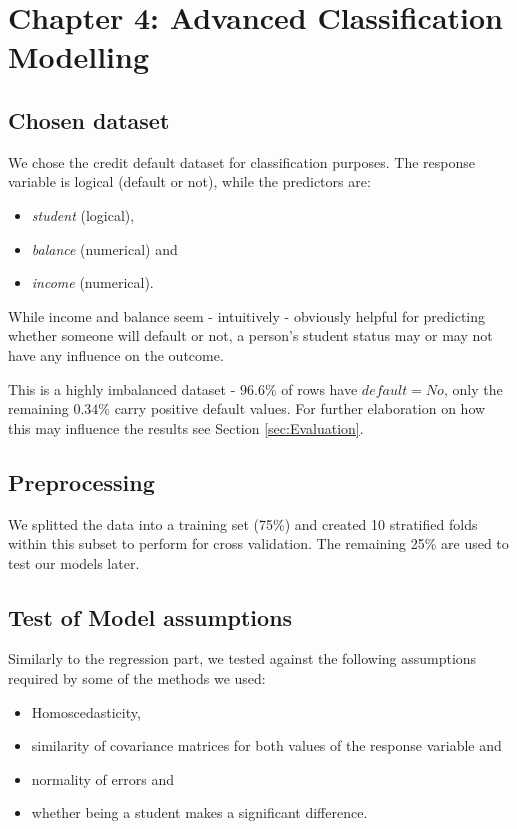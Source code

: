 \documentclass[a4paper]{article}
\begin{document}
\section{Chapter 4: Advanced Classification Modelling}
\label{sec:classification}

\subsection{Chosen dataset}

We chose the credit default dataset for classification purposes. The response variable is logical (default or not), while the predictors are:
\begin{itemize}
	\item \emph{student} (logical),
   	\item \emph{balance} (numerical) and
    \item \emph{income} (numerical).
\end{itemize}
While income and balance seem - intuitively - obviously helpful for predicting whether someone will default or not, a person's student status may or may not have any influence on the outcome.

This is a highly imbalanced dataset - $96.6\%$ of rows have $default = No$, only the remaining $0.34\%$ carry positive default values. For further elaboration on how this may influence the results see Section \ref{sec:Evaluation}.

\subsection{Preprocessing}
We splitted the data into a training set (75\%) and created 10 stratified folds within this subset to perform for cross validation. The remaining 25\% are used to test our models later. 

\subsection{Test of Model assumptions}

Similarly to the regression part, we tested against the following assumptions required by some of the methods we used: 
\begin{itemize}
  \item Homoscedasticity,
  \item similarity of covariance matrices for both values of the response variable and
  \item normality of errors and
  \item whether being a student makes a significant difference.
\end{itemize}
\end{document}
